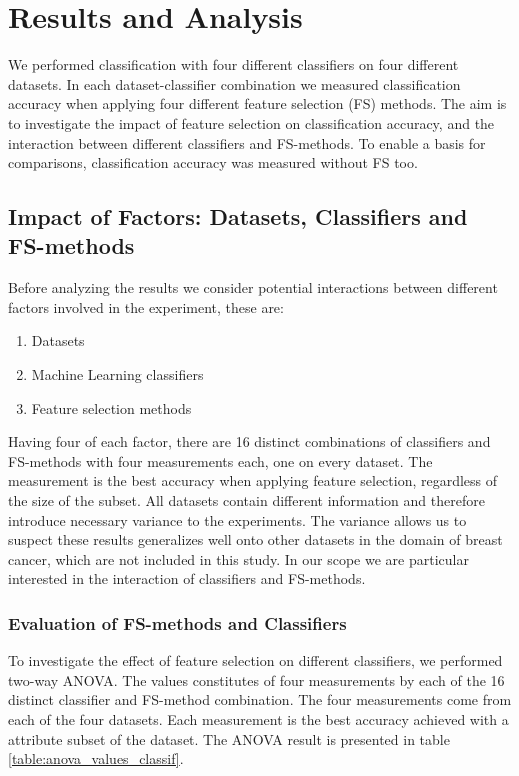 \chapter{Results and Analysis}

We performed classification with four different classifiers on four different datasets. In each dataset-classifier combination we measured classification accuracy when applying four different feature selection (FS) methods. The aim is to investigate the impact of feature selection on classification accuracy, and the interaction between different classifiers and FS-methods. To enable a basis for comparisons, classification accuracy was measured without FS too.

\section{Impact of Factors: Datasets, Classifiers and FS-methods}
\label{Variation_among_factors}

Before analyzing the results we consider potential interactions between different factors involved in the experiment, these are:

\begin{enumerate}
  \item Datasets
  \item Machine Learning classifiers
  \item Feature selection methods
\end{enumerate}

Having four of each factor, there are 16 distinct combinations of classifiers and FS-methods with four measurements each, one on every dataset. The measurement is the best accuracy when applying feature selection, regardless of the size of the subset. All datasets contain different information and therefore introduce necessary variance to the experiments. The variance allows us to suspect these results generalizes well onto other datasets in the domain of breast cancer, which are not included in this study. In our scope we are particular interested in the interaction of classifiers and FS-methods.

% 

\subsection{Evaluation of FS-methods and Classifiers}
\label{sec:fs_methods_classifiers}

To investigate the effect of feature selection on different classifiers, we performed two-way ANOVA. The values constitutes of four measurements by each of the 16 distinct classifier and FS-method combination. The four measurements come from each of the four datasets. Each measurement is the best accuracy achieved with a attribute subset of the dataset. The ANOVA result is presented in table \ref{table:anova_values_classif}.

